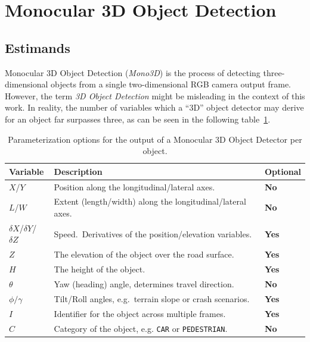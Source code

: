 \section{Monocular 3D Object Detection}
\label{sec:monodet}

\subsection{Estimands}
\label{subsec:estimands}

Monocular 3D Object Detection (\textit{Mono3D}) is the process of detecting three-dimensional objects from a single two-dimensional RGB camera output frame.
However, the term \textit{3D Object Detection} might be misleading in the context of this work.
In reality, the number of variables which a \enquote{3D} object detector may derive for an object far surpasses three, as can be seen in the following table~\ref{tab:mono3d-variables}.

\begin{table}[h]
    \centering
    \caption{Parameterization options for the output of a Monocular 3D Object Detector per object.}
    \label{tab:mono3d-variables}
    \begin{tabular}{lll}
        \toprule
        Variable & Description & Optional \\
        \midrule
        $X$/$Y$ & Position along the longitudinal/lateral axes.\ & \textbf{No} \\
        \midrule
        $L$/$W$ & Extent (length/width) along the longitudinal/lateral axes.\ & \textbf{No} \\
        \midrule
        $\delta X$/$\delta Y$/$\delta Z$ & Speed.\ Derivatives of the position/elevation variables.\ & \textbf{Yes} \\
        \midrule
        $Z$ & The elevation of the object over the road surface.\ & \textbf{Yes} \\
        \midrule
        $H$ & The height of the object.\ & \textbf{Yes} \\
        \midrule
        $\theta$ & Yaw (heading) angle, determines travel direction.\ & \textbf{No} \\
        \midrule
        $\phi/\gamma$ & Tilt/Roll angles, e.g.\ terrain slope or crash scenarios.\ & \textbf{Yes} \\
        \midrule
        $I$ & Identifier for the object across multiple frames.\ & \textbf{Yes} \\
        \midrule
        $C$ & Category of the object, e.g. \texttt{CAR} or \texttt{PEDESTRIAN}.\ & \textbf{No} \\
        \bottomrule
    \end{tabular}
\end{table}

